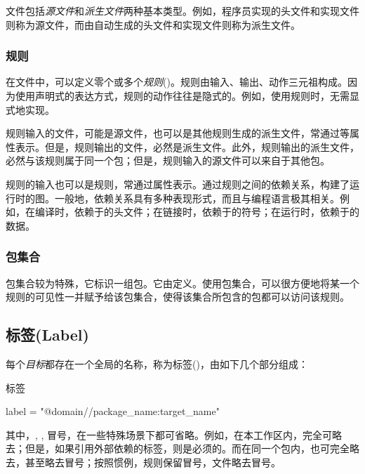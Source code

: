 \begin{content}
文件包括\emph{源文件}和\emph{派生文件}两种基本类型。例如，程序员实现的\cpp{}头文件和实现文件则称为源文件，而由自动生成的\cpp{}头文件和实现文件则称为派生文件。

\subsubsection{规则}

在文件中，可以定义零个或多个\emph{规则}()。规则由输入、输出、动作三元祖构成。因为使用声明式的表达方式，规则的动作往往是隐式的。例如，使用规则时，无需显式地实现。

规则输入的文件，可能是源文件，也可以是其他规则生成的派生文件，常通过等属性表示。但是，规则输出的文件，必然是派生文件。此外，规则输出的派生文件，必然与该规则属于同一个包；但是，规则输入的源文件可以来自于其他包。

规则的输入也可以是规则，常通过属性表示。通过规则之间的依赖关系，构建了运行时的图。一般地，依赖关系具有多种表现形式，而且与编程语言极其相关。例如，在编译时，依赖于的头文件；在链接时，依赖于的符号；在运行时，依赖于的数据。

\subsubsection{包集合}

包集合较为特殊，它标识一组包。它由定义。使用包集合，可以很方便地将某一个规则的可见性一并赋予给该包集合，使得该集合所包含的包都可以访问该规则。

\subsection{标签(Label)}

每个\emph{目标}都存在一个全局的名称，称为标签()，由如下几个部分组成：

\begin{nodiff}{标签}
 \begin{c++}
label = "@domain//package_name:target_name"
 \end{c++}
\end{nodiff}

其中，, , 冒号，在一些特殊场景下都可省略。例如，在本工作区内，完全可略去；但是，如果引用外部依赖的标签，则是必须的。而在同一个包内，也可完全略去，甚至略去冒号；按照惯例，规则保留冒号，文件略去冒号。


\end{content}
